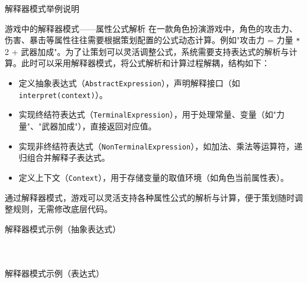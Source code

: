 \documentclass[UTF8,aspectratio=169]{beamer}
\begin{document}
\begin{frame}{解释器模式举例说明}
    \begin{exampleytublock}{游戏中的解释器模式——属性公式解析}
        在一款角色扮演游戏中，角色的攻击力、伤害、暴击等属性往往需要根据策划配置的公式动态计算。例如"攻击力 = 力量 \texttt{*} 2 + 武器加成"。为了让策划可以灵活调整公式，系统需要支持表达式的解析与计算。此时可以采用解释器模式，将公式解析和计算过程解耦，结构如下：
        \begin{itemize}
            \item 定义抽象表达式（\texttt{AbstractExpression}），声明解释接口（如 \texttt{interpret(context)}）。
            \item 实现终结符表达式（\texttt{TerminalExpression}），用于处理常量、变量（如"力量"、"武器加成"），直接返回对应值。
            \item 实现非终结符表达式（\texttt{NonTerminalExpression}），如加法、乘法等运算符，递归组合并解释子表达式。
            \item 定义上下文（\texttt{Context}），用于存储变量的取值环境（如角色当前属性表）。
        \end{itemize}
        通过解释器模式，游戏可以灵活支持各种属性公式的解析与计算，便于策划随时调整规则，无需修改底层代码。
    \end{exampleytublock}
\end{frame}

\begin{frame}{解释器模式示例（抽象表达式）}
    \begin{columns}
        \begin{column}{0.48\textwidth}
            \inputminted[firstline=1, lastline=18]{cpp}{code/interpreter_pattern.cpp}
        \end{column}
        \begin{column}{0.48\textwidth}
            \inputminted[firstline=19, lastline=37]{cpp}{code/interpreter_pattern.cpp}
        \end{column}
    \end{columns}
\end{frame}

\begin{frame}{解释器模式示例（表达式）}
    \begin{columns}
        \begin{column}{0.48\textwidth}
            \inputminted[firstline=39, lastline=55]{cpp}{code/interpreter_pattern.cpp}
        \end{column}
        \begin{column}{0.48\textwidth}
            \inputminted[firstline=56, lastline=73]{cpp}{code/interpreter_pattern.cpp}
        \end{column}
    \end{columns}
\end{frame}
\end{document}
